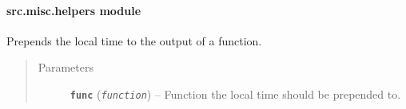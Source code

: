 \documentclass[letterpaper,10pt,english]{sphinxmanual}
\begin{document}
\begin{fulllineitems}
\label{src.misc:src.misc.decorators.alt}
\end{fulllineitems}


\begin{fulllineitems}
\label{src.misc:src.misc.decorators.log_time}
\end{fulllineitems}


\begin{fulllineitems}
\label{src.misc:src.misc.decorators.log_time_mp}
\end{fulllineitems}



\paragraph{src.misc.helpers module}
\label{src.misc:src-misc-helpers-module}\label{src.misc:module-src.misc.helpers}

\begin{fulllineitems}
\label{src.misc:src.misc.helpers.alt}
Prepends the local time to the output of a function.
\begin{quote}\begin{description}
\item[{Parameters}] \leavevmode
\textbf{\texttt{func}} (\emph{\texttt{function}}) -- Function the local time should be prepended to.

\end{description}\end{quote}

\end{fulllineitems}


\begin{fulllineitems}
\label{src.misc:src.misc.helpers.capitalize}
\end{fulllineitems}
\end{document}
